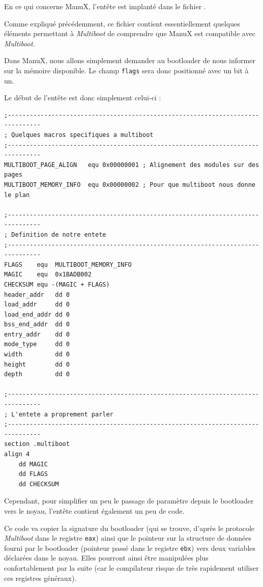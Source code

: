    En ce qui concerne ManuX, l'entête est
implanté dans le fichier .

   Comme expliqué précédemment, ce fichier contient essentiellement
quelques éléments permettant à {\em Multiboot} de comprendre que ManuX
est compatible avec {\em Multiboot}.

   Dans ManuX, nous allons simplement demander au bootloader de nous
informer sur la mémoire disponible. Le champ \lstinline!flags! sera
donc positionné avec un bit à un.

   Le début de l'entête est donc simplement celui-ci :

\begin{lstlisting}
;-------------------------------------------------------------------------------
; Quelques macros specifiques a multiboot
;-------------------------------------------------------------------------------
MULTIBOOT_PAGE_ALIGN   equ 0x00000001 ; Alignement des modules sur des pages
MULTIBOOT_MEMORY_INFO  equ 0x00000002 ; Pour que multiboot nous donne le plan

;-------------------------------------------------------------------------------
; Definition de notre entete
;-------------------------------------------------------------------------------
FLAGS    equ  MULTIBOOT_MEMORY_INFO 
MAGIC    equ  0x1BADB002        
CHECKSUM equ -(MAGIC + FLAGS)
header_addr   dd 0
load_addr     dd 0
load_end_addr dd 0
bss_end_addr  dd 0
entry_addr    dd 0
mode_type     dd 0
width         dd 0
height        dd 0
depth         dd 0

;-------------------------------------------------------------------------------
; L'entete a proprement parler
;-------------------------------------------------------------------------------
section .multiboot
align 4
	dd MAGIC
	dd FLAGS
	dd CHECKSUM
\end{lstlisting}  

   Cependant, pour simplifier un peu le passage de paramètre depuis le
bootloader vers le noyau, l'entête contient également un peu de
code.

   Ce code va copier la signature du bootloader (qui se trouve,
d'après le protocole {\em Multiboot} dans le registre \lstinline!eax!)
ainsi que le pointeur sur la structure de données fourni par le
bootloader (pointeur passé dans le registre \lstinline!ebx!) vers deux
variables déclarées dans le noyau. Elles pourront ainsi être
manipulées plus confortablement par la suite (car le compilateur
risque de très rapidement utiliser ces registres généraux).

